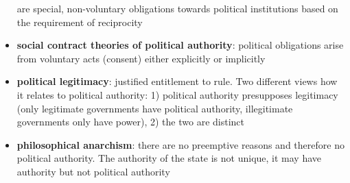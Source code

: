 \begin{itemize}
	 are special, non-voluntary obligations towards political institutions
	 based on the requirement of reciprocity
	\item \textbf{social contract theories of political authority}:
	 political obligations arise from voluntary acts (consent) either
	 explicitly or implicitly
	\item \textbf{political legitimacy}: justified entitlement to rule.
	 Two different views how it relates to political authority: 1)
	 political authority presupposes legitimacy (only legitimate
	 governments have political authority, illegitimate governments only
	 have power), 2) the two are distinct
	\item \textbf{philosophical anarchism}: there are no preemptive
	 reasons and therefore no political authority. The authority of the
	 state is not unique, it may have authority but not political
	 authority
\end{itemize}
